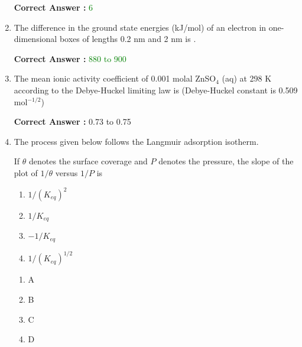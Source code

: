 \documentclass[journal,12pt,onecolumn]{exam}
\theoremstyle{remark}
\newcommand{\correct}{\textcolor{correctgreen}{\checkmark}}
\newcommand{\wrong}{\textcolor{wrongred}{\ding{55}}} %
\begin{document}
\begin{enumerate}
\hfill{}


\textbf{Correct Answer :} \textcolor{green}{6}


\item
The difference in the ground state energies (kJ/mol) of an electron in one-dimensional boxes of lengths 0.2 nm and 2 nm is \underline{\hspace{3cm}}.

\hfill{}


\textbf{Correct Answer :} \textcolor{green}{880 to 900}







\item
The mean ionic activity coefficient of 0.001 molal ZnSO$_4$ (aq) at 298 K according to the Debye-Huckel limiting law is (Debye-Huckel constant is 0.509 mol$^{-1/2}$) \underline{\hspace{3cm}}

\hfill{}


\textbf{Correct Answer :} \textcolor{green!60!black}{0.73 to 0.75}


\item
The process given below follows the Langmuir adsorption isotherm.


If $\theta$ denotes the surface coverage and $P$ denotes the pressure, the slope of the plot of $1/\theta$ versus $1/P$ is

\begin{enumerate}
    \item $1/(K_{eq})^2$
    \item $1/K_{eq}$
    \item $-1/K_{eq}$
    \item $1/(K_{eq})^{1/2}$
\end{enumerate}

\hfill{}

\begin{multicols}{2}
\begin{enumerate}
    \item \wrong A
    \item \wrong B
    \item \wrong C
    \item \correct D
\end{enumerate}
\end{multicols}



\end{enumerate}
\end{document}
